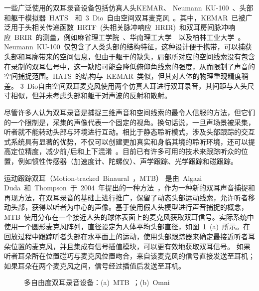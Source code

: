 一些广泛使用的双耳录音设备包括仿真人头KEMAR、
Neumann~KU-100~、头部和躯干模拟器~HATS~~和~3~Dio~自由空间双耳麦克风~。其中，KEMAR~已被广泛用于头相关传递函数~HRTF~(头相关脉冲响应~HRIR)~和双耳房间脉冲响应~BRIR~的测量，例如麻省理工学院~、华南理工大学~~以及柏林工业大学~。Neumann~KU-100~仅包含了人类头部的结构特征，这种设计便于携带，可以捕获头部和耳廓带来的空间信息，但由于躯干的缺失，肩部所对应的空间线索没有包含在录制的双耳信号中，这一缺陷可能会降低俯仰角线索的强度，从而限制了声音的空间捕捉范围。HATS~的结构与~KEMAR~类似，但其对人体的物理重现精度稍差。 3~Dio自由空间双耳麦克风使用两个仿真人耳进行双耳录音，其间距与人头尺寸相似，但并未考虑头部和躯干对声波的反射和散射。

尽管许多人认为双耳录音是捕捉三维声音和空间线索的最令人信服的方法，但它们的一个限制是，采集的声像代表一个固定的视角。换句话说，一旦声场景被采集，听者就不能转动头部与环境进行互动。相比于静态聆听模式，涉及头部跟踪的交互式系统具有显著的优势，不仅可以创建更加真实和身临其境的聆听环境，还可以提高定位精度，减少前/后和上下混淆~。目前已有许多可用的技术来跟踪听众的位置，例如惯性传感器（加速度计、陀螺仪）、声学跟踪、光学跟踪和磁跟踪。


运动跟踪双耳（Motion-tracked~Binaural~，MTB） 是由~Algazi Duda~和~Thompson~于~2004~年提出的一种方法~，作为一种新的双耳声音捕捉和再现方法，在双耳录音的基础上进行推广，保留了动态头部运动线索，允许听者移动头部，获得以听者为中心的声像。基于使用假人头模型进行声音捕捉的概念，MTB~使用分布在一个接近人头的球体表面上的麦克风获取双耳信号。实际系统中使用一个圆形麦克风阵列，直径设定为人体平均头部直径，如图~\ref{fig:MTB&Omni}~(a)~所示。在回放过程中跟踪听者头部在水平面上的运动，使用头部跟踪器来确定最接近听者耳朵位置的麦克风，并且集成有信号插值模块，可以更有效地获取双耳信号。
如果听者耳朵所在位置碰巧与麦克风位置吻合，来自该麦克风的信号直接发送至耳机；如果耳朵在两个麦克风之间，信号经过插值后发送至耳机。

\begin{figure}[H]
\centering
{}
\hfill
{}
\caption{多自由度双耳录音设备：(a)~MTB~；(b)~Omni }
\label{fig:MTB&Omni}
\end{figure}


